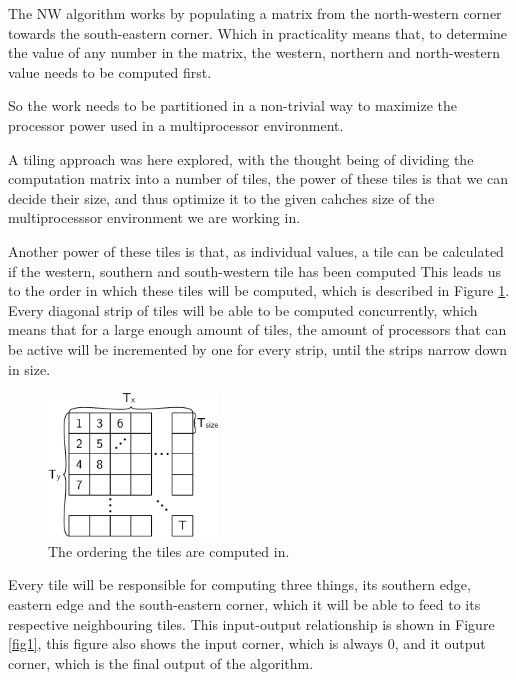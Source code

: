 The NW algorithm works by populating a matrix from the north-western corner towards the south-eastern corner. Which in practicality means that, to determine the value of any number in the matrix, the western, northern and north-western value needs to be computed first.

So the work needs to be partitioned in a non-trivial way to maximize the processor power used in a multiprocessor environment.

A tiling approach was here explored\cite{TODO}, with the thought being of dividing the computation matrix into a number of tiles, the power of these tiles is that we can decide their size, and thus optimize it to the given cahches size of the multiprocesssor environment we are working in.

Another power of these tiles is that, as individual values, a tile can be calculated if the western, southern and south-western tile has been computed This leads us to the order in which these tiles will be computed, which is described in Figure \ref{fig2}. Every diagonal strip of tiles will be able to be computed concurrently, which means that for a large enough amount of tiles, the amount of processors that can be active will be incremented by one for every strip, until the strips narrow down in size.
\begin{figure}[H]
  \center
  \includegraphics[width=0.4\textwidth]{fig/fig2.pdf}
  \caption{The ordering the tiles are computed in.}
  \label{fig2}
\end{figure}
Every tile will be responsible for computing three things, its southern edge, eastern edge and the south-eastern corner, which it will be able to feed to its respective neighbouring tiles. This input-output relationship is shown in Figure \ref{fig1}, this figure also shows the input corner, which is always 0, and it output corner, which is the final output of the algorithm.
